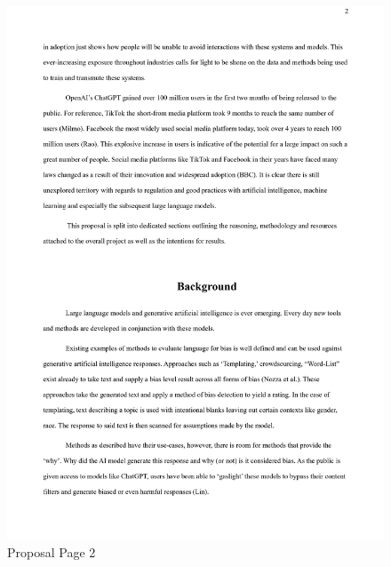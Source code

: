 \documentclass[12pt]{article}
\begin{document}
\begin{figure}[H]
    \centering
    \includegraphics[width=0.85\linewidth]{Images/0002.jpg}
    \caption{Proposal Page 2}
    
\end{figure}
\end{document}
